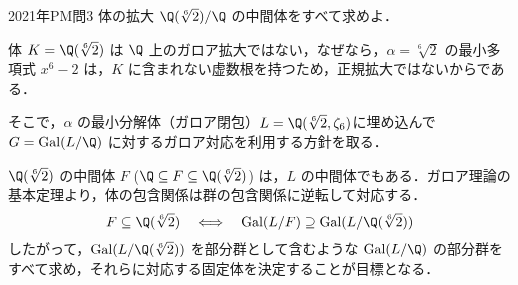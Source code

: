 \documentclass[a4paper,11pt]{ltjsarticle}
\title{}
\author{}
\date{}
\begin{document}
\begin{ascolorbox17}{2021年PM問3}
体の拡大 $\Q(\sqrt[6]{2})/\Q$ の中間体をすべて求めよ．
\end{ascolorbox17}
体 $K = \Q(\sqrt[6]{2})$ は $\Q$ 上のガロア拡大ではない，なぜなら，$\alpha = \sqrt[6]{2}$ の最小多項式 $x^6-2$ は，$K$ に含まれない虚数根を持つため，正規拡大ではないからである．

そこで，$\alpha$ の最小分解体（ガロア閉包）$L = \Q(\sqrt[6]{2}, \zeta_6)$に埋め込んで$G = \text{Gal}(L/\Q)$ に対するガロア対応を利用する方針を取る．

$\Q(\sqrt[6]{2})$ の中間体 $F$ ($\Q \subseteq F \subseteq \Q(\sqrt[6]{2})$) は，$L$ の中間体でもある．ガロア理論の基本定理より，体の包含関係は群の包含関係に逆転して対応する．
\[
F \subseteq \Q(\sqrt[6]{2}) \quad \Longleftrightarrow \quad \text{Gal}(L/F) \supseteq \text{Gal}(L/\Q(\sqrt[6]{2}))
\]
したがって，$\text{Gal}(L/\Q(\sqrt[6]{2}))$ を部分群として含むような $\text{Gal}(L/\Q)$ の部分群をすべて求め，それらに対応する固定体を決定することが目標となる．\\[5pt]
\ans
\end{document}
